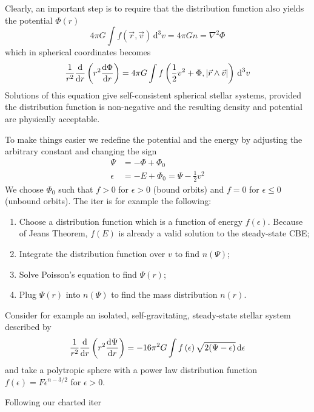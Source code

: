 \par Clearly, an important step is to require that the distribution function also yields the potential $\Phi(r)$
\begin{equation*}
    4\pi G \int f(\vec{r},\vec{v})\,\text{d}^{3}v = 4\pi G n = \nabla^{2}\Phi
\end{equation*}
which in spherical coordinates becomes 
\begin{equation*}
    \frac{1}{r^{2}}\frac{\text{d}}{\text{d}r}\left(r^{2}\frac{\text{d}\Phi}{\text{d}r}\right) = 4\pi G \int f\left(\frac{1}{2}v^{2}+\Phi, |\vec{r}\wedge\vec{v}|\right)\,\text{d}^{3}v
\end{equation*}
Solutions of this equation give self-consistent spherical stellar systems, provided the distribution function is non-negative and the resulting density and potential are physically acceptable.
\par To make things easier we redefine the potential and the energy by adjusting the arbitrary constant and changing the sign
\begin{align*}
    \Psi &= -\Phi +\Phi_{0}\\
    \epsilon &= -E +\Phi_{0} = \Psi -\frac{1}{2}v^{2}
\end{align*}
We choose $\Phi_{0}$ such that $f>0$ for $\epsilon>0$ (bound orbits) and $f=0$ for $\epsilon \leq 0$ (unbound orbits). The iter is for example the following:
\begin{enumerate}
    \item  Choose a distribution function which is a function of energy $f(\epsilon)$. Because of Jeans Theorem, $f(E)$ is already a valid solution to the steady-state CBE;
    \item Integrate the distribution function over $v$ to find $n(\Psi)$;
    \item Solve Poisson’s equation to find $\Psi(r)$;
    \item Plug $\Psi(r)$ into $n(\Psi)$ to find the mass distribution $n(r)$.
\end{enumerate}
Consider for example an isolated, self-gravitating, steady-state stellar system described by
\begin{equation*}
    \frac{1}{r^{2}}\frac{\text{d}}{\text{d}r}\left(r^{2}\frac{\text{d}\Psi}{\text{d}r}\right) = -16\pi^{2} G \int f\left(\epsilon\right)\sqrt{2(\Psi-\epsilon)}\,\text{d}\epsilon
\end{equation*}
and take a polytropic sphere with a power law distribution function $f(\epsilon) = F\epsilon^{n-3/2}$ for $\epsilon > 0$.
\par Following our charted iter
